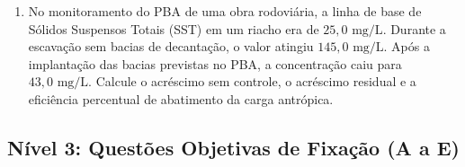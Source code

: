 \begin{enumerate}[leftmargin=1.8em, itemsep=4pt, resume]
  \item No monitoramento do PBA de uma obra rodoviária, a linha de base de Sólidos Suspensos Totais (SST) em um riacho era de $25{,}0\text{ mg/L}$. Durante a escavação sem bacias de decantação, o valor atingiu $145{,}0\text{ mg/L}$. Após a implantação das bacias previstas no PBA, a concentração caiu para $43{,}0\text{ mg/L}$. Calcule o acréscimo sem controle, o acréscimo residual e a eficiência percentual de abatimento da carga antrópica.
  \espacoResolucao[2.4cm]
\end{enumerate}

\subsection*{Nível 3: Questões Objetivas de Fixação (A a E)}


